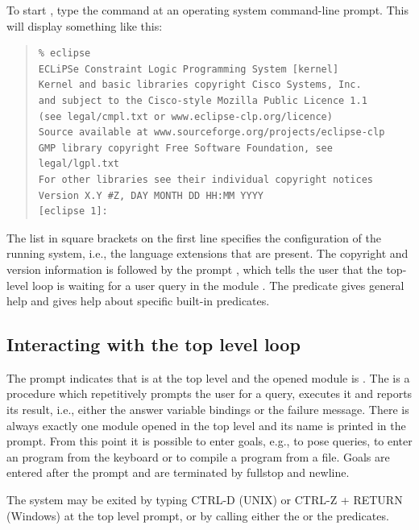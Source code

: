 To start {\eclipse}, type the command  at an
operating system command-line prompt.
This will display something like this:
\begin{quote}
\begin{verbatim}
% eclipse
ECLiPSe Constraint Logic Programming System [kernel]
Kernel and basic libraries copyright Cisco Systems, Inc.
and subject to the Cisco-style Mozilla Public Licence 1.1
(see legal/cmpl.txt or www.eclipse-clp.org/licence)
Source available at www.sourceforge.org/projects/eclipse-clp
GMP library copyright Free Software Foundation, see legal/lgpl.txt
For other libraries see their individual copyright notices
Version X.Y #Z, DAY MONTH DD HH:MM YYYY
[eclipse 1]:
\end{verbatim}
\end{quote}
The list in square brackets on the first line specifies the configuration
of the running system, i.e., the language extensions that are present.
The copyright and version information is followed by the prompt
\notation{[eclipse 1]:}, which tells the user that the top-level loop is waiting
for a user query in the module .
The predicate  gives
general help and  gives
help about specific built-in predicates.

\subsection{Interacting with the top level loop}

The {\eclipse} prompt \notation{[eclipse 1]:} indicates that {\eclipse}
is at the top level
and the opened module is .
The  is a procedure which repetitively
prompts the user for a query, executes it and reports its
result, i.e., either the answer variable bindings or the
failure message.
There is always exactly one module opened in the top level
and its name is printed in the prompt.
From this point it is possible to enter {\eclipse} goals, e.g., to
pose queries, to enter an {\eclipse} program from the keyboard
or to compile a program from a file.
Goals are entered after the prompt and are terminated by fullstop and
newline.

The {\eclipse} system may be exited by typing CTRL-D (UNIX) or
CTRL-Z + RETURN (Windows) at the top level prompt,
or by calling either the 
or the  predicates.

